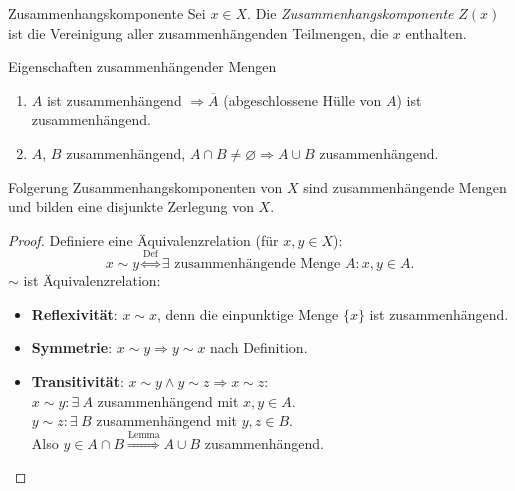 \begin{definition}{Zusammenhangskomponente}
  Sei $ x \in X $. Die \emph{Zusammenhangskomponente} $ Z(x) $ ist die Vereinigung aller zusammenhängenden Teilmengen, die $ x $ enthalten.
\end{definition}

\begin{lemma}{Eigenschaften zusammenhängender Mengen}
  \begin{enumerate}
    \item $ A $ ist zusammenhängend $ \Rightarrow \overline{A} $ (abgeschlossene Hülle von $ A $) ist zusammenhängend.
    \item $ A $, $ B $ zusammenhängend, $ A \cap B \neq \varnothing \Rightarrow A \cup B $ zusammenhängend. 
  \end{enumerate}
\end{lemma}

\begin{bla}{Folgerung}
  Zusammenhangskomponenten von $ X $ sind zusammenhängende Mengen und bilden eine disjunkte Zerlegung von $ X $.
  \begin{proof}
    Definiere eine Äquivalenzrelation (für $ x, y \in X $):
    \begin{equation*}
      x \sim y \overset{\text{Def}}{\Leftrightarrow} \exists \text{ zusammenhängende Menge } A : x, y \in A\text{.}
    \end{equation*}
    $ \sim $ ist Äquivalenzrelation:
    \begin{itemize}
      \item \textbf{Reflexivität}: $ x \sim x $, denn die einpunktige Menge $ \{ x \} $ ist zusammenhängend. 
      \item \textbf{Symmetrie}: $ x \sim y \Rightarrow y \sim x $ nach Definition.
      \item \textbf{Transitivität}: $ x \sim y \wedge y \sim z \Rightarrow x \sim z $: \\
        $ x \sim y: \exists \ A $ zusammenhängend mit $ x,y \in A $. \\
        $ y \sim z: \exists \ B $ zusammenhängend mit $ y,z \in B $. \\
        Also $ y \in A \cap B \overset{\text{Lemma}}{\Rightarrow} A \cup B $ zusammenhängend.
    \end{itemize}
  \end{proof}
\end{bla}
